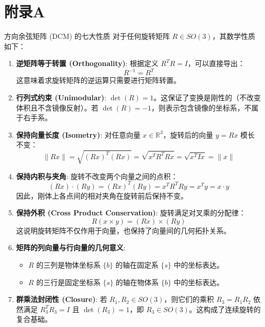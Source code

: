 \chapter*{附录A}
\begin{mybox}{方向余弦矩阵 (DCM) 的七大性质}
对于任何旋转矩阵 $R \in SO(3)$，其数学性质如下：

\begin{enumerate}
    \item \textbf{逆矩阵等于转置 (Orthogonality)}: 
    根据定义 $R^T R = I$，可以直接导出：
    \begin{equation}
        R^{-1} = R^T
    \end{equation}
    这意味着求旋转矩阵的逆运算只需要进行矩阵转置。

    \item \textbf{行列式约束 (Unimodular)}: 
    $\det(R) = 1$。这保证了变换是刚性的（不改变体积且不含镜像反射）。若 $\det(R) = -1$，则表示包含镜像的坐标系，不属于右手系。

    \item \textbf{保持向量长度 (Isometry)}: 
    对任意向量 $x \in \mathbb{R}^3$，旋转后的向量 $y = Rx$ 模长不变：
    \begin{equation}
        \|Rx\| = \sqrt{(Rx)^T (Rx)} = \sqrt{x^T R^T R x} = \sqrt{x^T I x} = \|x\|
    \end{equation}

    \item \textbf{保持内积与夹角}: 
    旋转不改变两个向量之间的点积：
    \begin{equation}
        (Rx) \cdot (Ry) = (Rx)^T (Ry) = x^T R^T R y = x^T y = x \cdot y
    \end{equation}
    因此，刚体上各点间的相对夹角在旋转前后保持不变。

    \item \textbf{保持外积 (Cross Product Conservation)}: 
    旋转满足对叉乘的分配律：
    \begin{equation}
        R(x \times y) = (Rx) \times (Ry)
    \end{equation}
    这说明旋转矩阵不仅作用于向量，也保持了向量间的几何拓扑关系。

    \item \textbf{矩阵的列向量与行向量的几何意义}: 
    \begin{itemize}
        \item $R$ 的三列是物体坐标系 $\{b\}$ 的轴在固定系 $\{s\}$ 中的坐标表达。
        \item $R$ 的三行是固定坐标系 $\{s\}$ 的轴在物体系 $\{b\}$ 中的坐标表达。
    \end{itemize}

    \item \textbf{群乘法封闭性 (Closure)}: 
    若 $R_1, R_2 \in SO(3)$，则它们的乘积 $R_3 = R_1 R_2$ 依然满足 $R_3^T R_3 = I$ 且 $\det(R_3) = 1$，即 $R_3 \in SO(3)$。这构成了连续旋转的复合基础。
\end{enumerate}
\end{mybox}